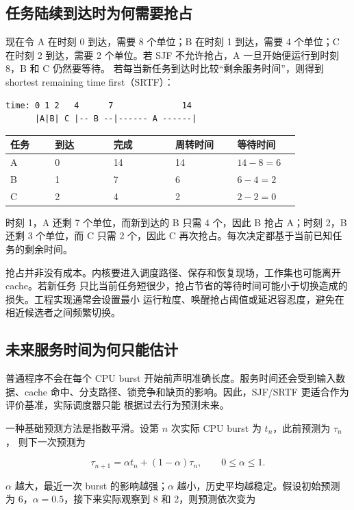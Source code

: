 \subsection{任务陆续到达时为何需要抢占}

现在令 A 在时刻 0 到达，需要 8 个单位；B 在时刻 1 到达，需要 4 个单位；C 在时刻 2
到达，需要 2 个单位。若 SJF 不允许抢占，A 一旦开始便运行到时刻 8，B 和 C 仍然要等待。
若每当新任务到达时比较“剩余服务时间”，则得到 shortest remaining time first（SRTF）：

\begin{lstlisting}
time: 0 1 2   4      7              14
      |A|B| C |-- B --|------ A ------|
\end{lstlisting}

\begin{longtable}{|L{0.13\linewidth}|L{0.17\linewidth}|L{0.18\linewidth}|L{0.18\linewidth}|L{0.18\linewidth}|}
\toprule
任务 & 到达 & 完成 & 周转时间 & 等待时间 \\
\midrule
A & 0 & 14 & 14 & $14-8=6$ \\\tablerowrule
B & 1 & 7 & 6 & $6-4=2$ \\\tablerowrule
C & 2 & 4 & 2 & $2-2=0$ \\
\bottomrule
\end{longtable}

时刻 1，A 还剩 7 个单位，而新到达的 B 只需 4 个，因此 B 抢占 A；时刻 2，B 还剩
3 个单位，而 C 只需 2 个，因此 C 再次抢占。每次决定都基于当前已知任务的剩余时间。

抢占并非没有成本。内核要进入调度路径、保存和恢复现场，工作集也可能离开 cache。若新任务
只比当前任务短很少，抢占节省的等待时间可能小于切换造成的损失。工程实现通常会设置最小
运行粒度、唤醒抢占阈值或延迟容忍度，避免在相近候选者之间频繁切换。

\subsection{未来服务时间为何只能估计}

普通程序不会在每个 CPU burst 开始前声明准确长度。服务时间还会受到输入数据、cache
命中、分支路径、锁竞争和缺页的影响。因此，SJF/SRTF 更适合作为评价基准，实际调度器只能
根据过去行为预测未来。

一种基础预测方法是指数平滑。设第 $n$ 次实际 CPU burst 为 $t_n$，此前预测为 $\tau_n$，
则下一次预测为

\[
\tau_{n+1}=\alpha t_n+(1-\alpha)\tau_n,\qquad 0\leq\alpha\leq 1.
\]

$\alpha$ 越大，最近一次 burst 的影响越强；$\alpha$ 越小，历史平均越稳定。假设初始预测
为 6，$\alpha=0.5$，接下来实际观察到 8 和 2，则预测依次变为

